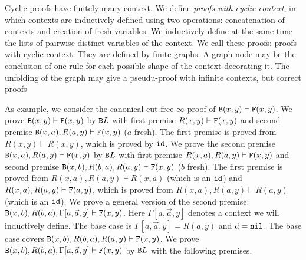\documentclass[a4paper,12pt]{article}
\newcommand{\Backward}         { {\tt B} }
\newcommand{\Forward}         { {\tt F} }
\newcommand{\id}              { {\tt id} }
\newcommand{\nil}             { {\tt nil} }
\begin{document}
Cyclic proofs have finitely many context. We define \emph{proofs with cyclic context}, in which contexts are inductively defined using two operations: concatenation of contexts and creation of fresh variables. We inductively define at the same time the lists of pairwise distinct variables of the context. We call these proofs: proofs with cyclic context. They are defined by finite graphs. A graph node may be the conclusion of one rule for each possible shape of the context decorating it. The unfolding of the graph may give a pseudu-proof with infinite contexts, but correct proofs 

As example, we consider the canonical cut-free $\infty$-proof of $\Backward(x,y) \vdash \Forward(x,y)$. We prove  $\Backward(x,y) \vdash \Forward(x,y)$ by $\Backward L$ with first premise $R(x,y) \vdash \Forward(x,y)$ and second premise $\Backward(x,a), R(a,y) \vdash \Forward(x,y)$ ($a$ fresh). The first premise is proved from $R(x,y) \vdash R(x,y)$, which is proved by $\id$. We prove the second premise $\Backward(x,a), R(a,y) \vdash \Forward(x,y)$ by $\Backward L$ with first premise $R(x,a), R(a,y) \vdash \Forward(x,y)$ and second premise  $\Backward(x,b), R(b,a), R(a,y) \vdash \Forward(x,y)$ ($b$ fresh). The first premise is proved from $R(x,a), R(a,y) \vdash R(x,a)$ (which is an $\id$) and $R(x,a), R(a,y) \vdash \Forward(a,y)$, which is proved from $R(x,a), R(a,y) \vdash R(a,y)$ (which is an $\id$). We prove a general version of the second premise: $\Backward(x,b), R(b,a), \Gamma[a,\vec{a},y] \vdash \Forward(x,y)$. 
Here $\Gamma[a,\vec{a},y]$ denotes a context we will inductively define. The base case is $\Gamma[a,\vec{a},y] = R(a,y)$ and $\vec{a}=\nil$. The base case covers $\Backward(x,b), R(b,a), R(a,y) \vdash \Forward(x,y)$. 
We prove $\Backward(x,b), R(b,a), \Gamma[a,\vec{a},y]\vdash \Forward(x,y)$ by $\Backward L$ with the following premises.
\end{document}
